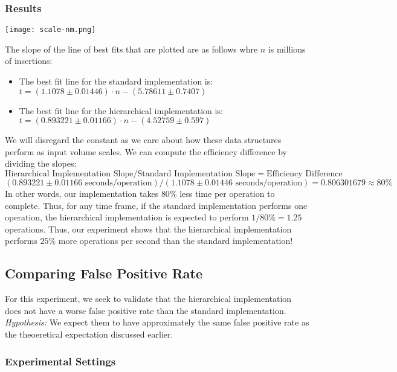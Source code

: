 \subsubsection{Results}
\begin{center}
    \texttt{[image: scale-nm.png]}
\end{center}
The slope of the line of best fits that are plotted are as follows whre $n$ is millions of insertions:
\begin{itemize}
    \item The best fit line for the standard implementation is: $t = (1.1078 \pm 0.01446 )\cdot n - (5.78611   \pm 0.7407)$
    \item The best fit line for the hierarchical implementation is: $t = (0.893221 \pm 0.01166 )\cdot n - (4.52759 \pm 0.597 )$
\end{itemize}
We will disregard the constant as we care about how these data structures perform as input volume scales. We can compute the efficiency difference by dividing the slopes:
$$\text{Hierarchical Implementation Slope}/ \text{Standard Implementation Slope} = \text{Efficiency Difference}$$
$$(0.893221 \pm 0.01166 \text{ seconds/operation}) / (1.1078 \pm 0.01446 \text{ seconds/operation}) = 0.806301679 \approx 80\%$$
In other words, our implementation takes $80\%$ less time per operation to complete. 
Thus, for any time frame, if the standard implementation performs one operation, the hierarchical implementation is expected to perform $1/80\% = 1.25$ operations.
Thus, our experiment shows that the hierarchical implementation performs $25\%$ more operations per second than the standard implementation!


\subsection{Comparing False Positive Rate}

For this experiment, we seek to validate that the hierarchical implementation does not have a worse false positive rate than the standard implementation.
\textit{Hypothesis:} We expect them to have approximately the same false positive rate as the theoeretical expectation discussed earlier.

\subsubsection{Experimental Settings}

